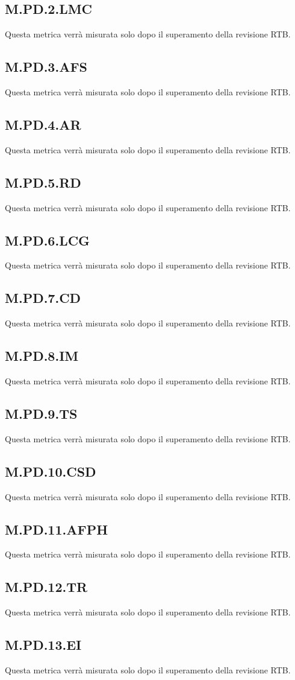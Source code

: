 \documentclass[10pt, a4paper]{article}
\begin{document}
\subsection{M.PD.2.LMC}
Questa metrica verrà misurata solo dopo il superamento della revisione RTB.
\subsection{M.PD.3.AFS}
Questa metrica verrà misurata solo dopo il superamento della revisione RTB.
\subsection{M.PD.4.AR}
Questa metrica verrà misurata solo dopo il superamento della revisione RTB.
\subsection{M.PD.5.RD}
Questa metrica verrà misurata solo dopo il superamento della revisione RTB.
\subsection{M.PD.6.LCG}
Questa metrica verrà misurata solo dopo il superamento della revisione RTB.
\subsection{M.PD.7.CD}
Questa metrica verrà misurata solo dopo il superamento della revisione RTB.
\subsection{M.PD.8.IM}
Questa metrica verrà misurata solo dopo il superamento della revisione RTB.
\subsection{M.PD.9.TS}
Questa metrica verrà misurata solo dopo il superamento della revisione RTB.
\subsection{M.PD.10.CSD}
Questa metrica verrà misurata solo dopo il superamento della revisione RTB.
\subsection{M.PD.11.AFPH}
Questa metrica verrà misurata solo dopo il superamento della revisione RTB.
\subsection{M.PD.12.TR}
Questa metrica verrà misurata solo dopo il superamento della revisione RTB.
\subsection{M.PD.13.EI}
Questa metrica verrà misurata solo dopo il superamento della revisione RTB.
\end{document}
